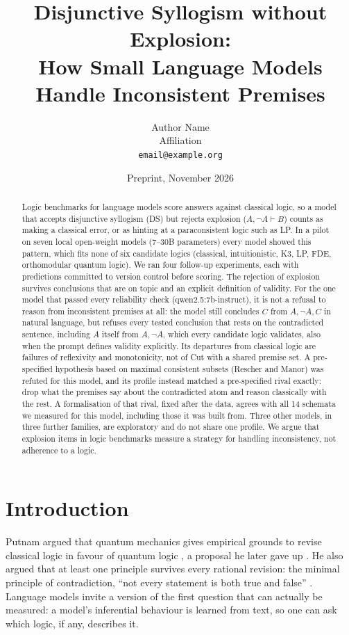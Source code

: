 \documentclass[11pt]{article}
\title{Disjunctive Syllogism without Explosion:\\How Small Language Models Handle Inconsistent Premises}
\author{Author Name\\Affiliation\\\texttt{email@example.org}}
\date{Preprint, November 2026}
\begin{document}
\maketitle

\begin{abstract}
Logic benchmarks for language models score answers against classical logic, so a model that accepts
disjunctive syllogism (DS) but rejects explosion ($A, \neg A \vdash B$) counts as making a classical error,
or as hinting at a paraconsistent logic such as LP. In a pilot on seven local open-weight models
(7--30B parameters) every model showed this pattern, which fits none of six candidate logics (classical,
intuitionistic, K3, LP, FDE, orthomodular quantum logic). We ran four follow-up experiments, each with
predictions committed to version control before scoring. The rejection of explosion survives conclusions
that are on topic and an explicit definition of validity. For the one model that passed every reliability
check (qwen2.5:7b-instruct), it is not a refusal to reason from inconsistent premises at all: the model
still concludes $C$ from $A, \neg A, C$ in natural language, but refuses every tested conclusion that
rests on the contradicted sentence, including $A$ itself from $A, \neg A$, which every candidate logic
validates, also when the prompt defines validity explicitly. Its departures from classical logic are failures of reflexivity and monotonicity, not of Cut with a
shared premise set.
A pre-specified hypothesis based on maximal consistent subsets (Rescher and Manor) was refuted for this
model, and its profile instead matched a pre-specified rival exactly: drop what the premises say about the
contradicted atom and reason classically with the rest. A formalisation of that rival, fixed after the
data, agrees with all 14 schemata we measured for this model, including those it was built from. Three
other models, in three further families, are exploratory and do not share one profile. We argue that
explosion items in logic benchmarks measure a strategy for handling inconsistency, not adherence to a
logic.
\end{abstract}

\section{Introduction}

Putnam argued that quantum mechanics gives empirical grounds to revise classical logic in favour of
quantum logic \citep{putnam1968}, a proposal he later gave up \citep{putnam2005}. He also argued that at
least one principle survives every rational revision: the minimal principle of contradiction, ``not
every statement is both true and false'' \citep{putnam1978}. Language models invite a version of the
first question that can actually be measured: a model's inferential behaviour is learned from text, so
one can ask which logic, if any, describes it.
\end{document}
